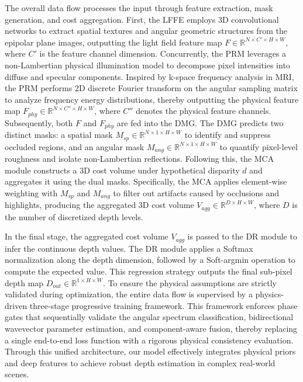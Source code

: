 The overall data flow processes the input through feature extraction, mask generation, and cost aggregation. First, the LFFE employs 3D convolutional networks to extract spatial textures and angular geometric structures from the epipolar plane images, outputting the light field feature map $F \in \mathbb{R}^{N \times C' \times H \times W}$, where $C'$ is the feature channel dimension. Concurrently, the PRM leverages a non-Lambertian physical illumination model to decompose pixel intensities into diffuse and specular components. Inspired by k-space frequency analysis in MRI, the PRM performs 2D discrete Fourier transform on the angular sampling matrix to analyze frequency energy distributions, thereby outputting the physical feature map $F_{phy} \in \mathbb{R}^{N \times C'' \times H \times W}$, where $C''$ denotes the physical feature channels. Subsequently, both $F$ and $F_{phy}$ are fed into the DMG. The DMG predicts two distinct masks: a spatial mask $M_{sp} \in \mathbb{R}^{N \times 1 \times H \times W}$ to identify and suppress occluded regions, and an angular mask $M_{ang} \in \mathbb{R}^{N \times 1 \times H \times W}$ to quantify pixel-level roughness and isolate non-Lambertian reflections. Following this, the MCA module constructs a 3D cost volume under hypothetical disparity $d$ and aggregates it using the dual masks. Specifically, the MCA applies element-wise weighting with $M_{sp}$ and $M_{ang}$ to filter out artifacts caused by occlusions and highlights, producing the aggregated 3D cost volume $V_{agg} \in \mathbb{R}^{D \times H \times W}$, where $D$ is the number of discretized depth levels.

In the final stage, the aggregated cost volume $V_{agg}$ is passed to the DR module to infer the continuous depth values. The DR module applies a Softmax normalization along the depth dimension, followed by a Soft-argmin operation to compute the expected value. This regression strategy outputs the final sub-pixel depth map $D_{out} \in \mathbb{R}^{1 \times H \times W}$. To ensure the physical assumptions are strictly validated during optimization, the entire data flow is supervised by a physics-driven three-stage progressive training framework. This framework enforces phase gates that sequentially validate the angular spectrum classification, bidirectional wavevector parameter estimation, and component-aware fusion, thereby replacing a single end-to-end loss function with a rigorous physical consistency evaluation. Through this unified architecture, our model effectively integrates physical priors and deep features to achieve robust depth estimation in complex real-world scenes.

